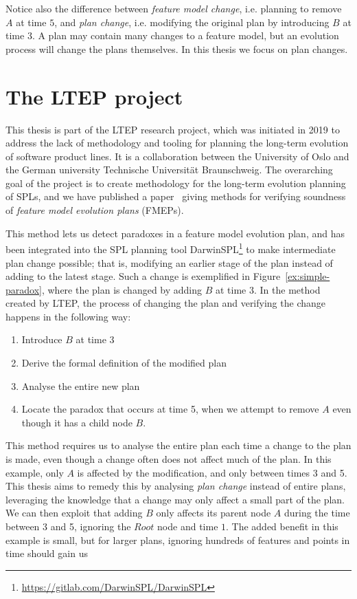 Notice also the difference between \emph{feature model change}, i.e. planning to remove $A$ at time $5$, and \emph{plan change}, i.e. modifying the original plan by introducing $B$ at time 3. A plan may contain many changes to a feature model, but an evolution process will change the plans themselves. In this thesis we focus on plan changes.

\section{The LTEP project}
\label{sec:the-ltep-project}
This thesis is part of the LTEP research project, which was initiated in 2019 to address the lack of methodology and tooling for planning the long-term evolution of software product lines. It is a collaboration between the University of Oslo and the German university Technische Universität Braunschweig. The overarching goal of the project is to create methodology for the long-term evolution planning of SPLs, and we have published a paper~\cite{art:consistency-preserving-evolution-planning} giving methods for verifying soundness of \emph{feature model evolution plans} (FMEPs). 

This method lets us detect paradoxes in a feature model evolution plan, and has been integrated into the SPL planning tool DarwinSPL\footnote{\url{https://gitlab.com/DarwinSPL/DarwinSPL}} to make intermediate plan change possible; that is, modifying an earlier stage of the plan instead of adding to the latest stage. Such a change is exemplified in Figure~\vref{ex:simple-paradox}, where the plan is changed by adding $B$ at time $3$. In the method created by LTEP, the process of changing the plan and verifying the change happens in the following way:
\begin{enumerate}[1)]
   \item Introduce $B$ at time $3$
   \item Derive the formal definition of the modified plan
   \item Analyse the entire new plan
   \item Locate the paradox that occurs at time 5, when we attempt to remove $A$ even though it has a child node $B$.
\end{enumerate}
This method requires us to analyse the entire plan each time a change to the plan is made, even though a change often does not affect much of the plan. In this example, only $A$ is affected by the modification, and only between times 3 and 5. This thesis aims to remedy this by analysing \emph{plan change} instead of entire plans, leveraging the knowledge that a change may only affect a small part of the plan. We can then exploit that adding $B$ only affects its parent node $A$ during the time between 3 and 5, ignoring the $Root$ node and time $1$. The added benefit in this example is small, but for larger plans, ignoring hundreds of features and points in time should gain us 


